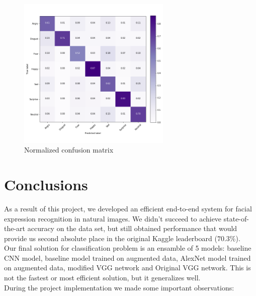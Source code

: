 \begin{figure}
	\centering
	\includegraphics[width=0.65\textwidth]{../images/confusion.png}
	\caption{Normalized confusion matrix}
	\label{fig:conf}
\end{figure}

\section{Conclusions}

As a result of this project, we developed an efficient end-to-end system for facial expression recognition in natural images. We didn't succeed to achieve state-of-the-art accuracy on the data set, but still obtained performance that would provide us second absolute place in the original Kaggle leaderboard ($70.3\%$).\\

Our final solution for classification problem is an ensamble of 5 models: baseline CNN model, baseline model trained on augmented data, AlexNet model trained on augmented data,  modified VGG network and Original VGG network. This is not the fastest or most efficient solution, but it generalizes well. \\

During the project implementation we made some important observations:

